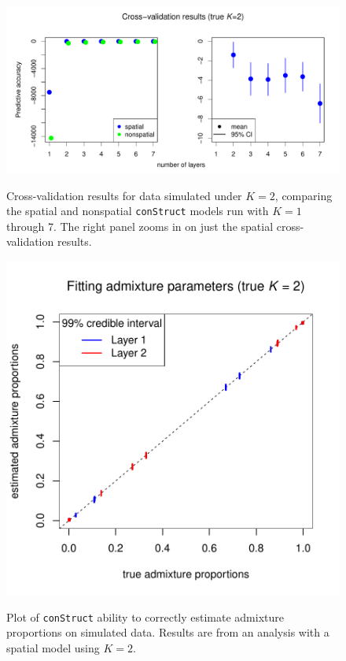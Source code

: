 \documentclass[10pt,letterpaper]{article}
\begin{document}
\begin{figure}
	\centering
		{\includegraphics[width=\textwidth]{figs/sims/simK2_std_xval.pdf}}
		\caption{
			Cross-validation results for data simulated under $K=2$,
			comparing the spatial and nonspatial \texttt{conStruct} models run with $K=1$ through 7.  
			The right panel zooms in on just the spatial cross-validation results.
		}\label{simK2_xval}
\end{figure}
\clearpage

\begin{figure}
	\centering
		{\includegraphics[width=\textwidth]{figs/sims/simK2_adprop_fit.pdf}}
		\caption{
			Plot of \texttt{conStruct} ability to correctly estimate admixture proportions on simulated data.
			Results are from an analysis with a spatial model using $K=2$.
		}\label{simK2_adprop_fit}
\end{figure}
\clearpage
\end{document}
